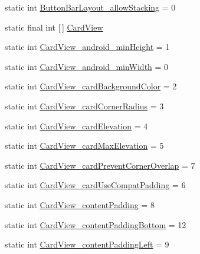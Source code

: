 \begin{DoxyCompactItemize}
\item 
static int \hyperlink{classandroid_1_1support_1_1v7_1_1cardview_1_1R_1_1styleable_a33f807242d99bbecae8b32d75a0f027e}{Button\+Bar\+Layout\+\_\+allow\+Stacking} = 0
\item 
static final int \mbox{[}$\,$\mbox{]} \hyperlink{classandroid_1_1support_1_1v7_1_1cardview_1_1R_1_1styleable_ad08b98a07471f174f404c58941fc82ca}{Card\+View}
\item 
static int \hyperlink{classandroid_1_1support_1_1v7_1_1cardview_1_1R_1_1styleable_ac257bacd270670d3fc6bfd460d3040b4}{Card\+View\+\_\+android\+\_\+min\+Height} = 1
\item 
static int \hyperlink{classandroid_1_1support_1_1v7_1_1cardview_1_1R_1_1styleable_a165f6907e0358c9373fd46989c5eaffc}{Card\+View\+\_\+android\+\_\+min\+Width} = 0
\item 
static int \hyperlink{classandroid_1_1support_1_1v7_1_1cardview_1_1R_1_1styleable_a9371dc0e42bf75930b7e2c770cd55985}{Card\+View\+\_\+card\+Background\+Color} = 2
\item 
static int \hyperlink{classandroid_1_1support_1_1v7_1_1cardview_1_1R_1_1styleable_aace2dfda6017f1faa65e0083e27d22c2}{Card\+View\+\_\+card\+Corner\+Radius} = 3
\item 
static int \hyperlink{classandroid_1_1support_1_1v7_1_1cardview_1_1R_1_1styleable_a722e279b5228de84f205a2cff6f3fea5}{Card\+View\+\_\+card\+Elevation} = 4
\item 
static int \hyperlink{classandroid_1_1support_1_1v7_1_1cardview_1_1R_1_1styleable_a07d7edea3f37f66423d90bc58c1bc837}{Card\+View\+\_\+card\+Max\+Elevation} = 5
\item 
static int \hyperlink{classandroid_1_1support_1_1v7_1_1cardview_1_1R_1_1styleable_ae36059e966df9b6eab68d01218774027}{Card\+View\+\_\+card\+Prevent\+Corner\+Overlap} = 7
\item 
static int \hyperlink{classandroid_1_1support_1_1v7_1_1cardview_1_1R_1_1styleable_a32c785b85bf780371d8996ca17967eec}{Card\+View\+\_\+card\+Use\+Compat\+Padding} = 6
\item 
static int \hyperlink{classandroid_1_1support_1_1v7_1_1cardview_1_1R_1_1styleable_ac1c8de17031173bc157d0bd6b488c607}{Card\+View\+\_\+content\+Padding} = 8
\item 
static int \hyperlink{classandroid_1_1support_1_1v7_1_1cardview_1_1R_1_1styleable_a04aea907d43f247611fdaa27549aa94b}{Card\+View\+\_\+content\+Padding\+Bottom} = 12
\item 
static int \hyperlink{classandroid_1_1support_1_1v7_1_1cardview_1_1R_1_1styleable_aaad29bef85433a8e7f930c1f2c8491f0}{Card\+View\+\_\+content\+Padding\+Left} = 9

\end{DoxyCompactItemize}
